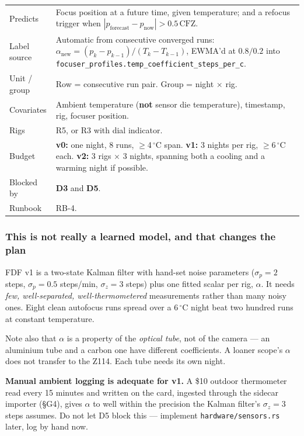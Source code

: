 \documentclass[11pt]{article}
\newcommand{\co}[1]{\texttt{\small #1}}
\begin{document}
\begin{center}
\small
\begin{tabular}{@{}p{}p{}@{}}
\toprule
Predicts & Focus position at a future time, given temperature; and a refocus trigger when $|p_{\mathrm{forecast}} - p_{\mathrm{now}}| > 0.5\,\mathrm{CFZ}$. \\
Label source & Automatic from consecutive converged runs: $\alpha_{\mathrm{new}} = (p_k - p_{k-1})/(T_k - T_{k-1})$, EWMA'd at $0.8/0.2$ into \co{focuser\_profiles.temp\_coefficient\_steps\_per\_c}. \\
Unit / group & Row = consecutive run pair. Group = night $\times$ rig. \\
Covariates & Ambient temperature (\textbf{not} sensor die temperature), timestamp, rig, focuser position. \\
Rigs & R5, or R3 with dial indicator. \\
Budget & \textbf{v0:} one night, 8 runs, $\geq$4\,$^\circ$C span. \textbf{v1:} 3 nights per rig, $\geq$6\,$^\circ$C each. \textbf{v2:} 3 rigs $\times$ 3 nights, spanning both a cooling and a warming night if possible. \\
Blocked by & \textbf{D3} and \textbf{D5}. \\
Runbook & RB-4. \\
\bottomrule
\end{tabular}
\end{center}

\subsubsection*{This is not really a learned model, and that changes the plan}

FDF v1 is a two-state Kalman filter with hand-set noise parameters
($\sigma_p = 2$ steps, $\sigma_{\dot p} = 0.5$ steps/min, $\sigma_z = 3$ steps)
plus one fitted scalar per rig, $\alpha$. It needs \emph{few, well-separated,
well-thermometered} measurements rather than many noisy ones. Eight clean
autofocus runs spread over a 6\,$^\circ$C night beat two hundred runs at
constant temperature.

Note also that $\alpha$ is a property of the \emph{optical tube}, not of the
camera --- an aluminium tube and a carbon one have different coefficients. A
loaner scope's $\alpha$ does not transfer to the Z114. Each tube needs its own
night.

\begin{keybox}
\textbf{Manual ambient logging is adequate for v1.} A \$10 outdoor
thermometer read every 15 minutes and written on the card, ingested through the
sidecar importer (\S G4), gives $\alpha$ to well within the precision the
Kalman filter's $\sigma_z = 3$ steps assumes. Do not let D5 block this ---
implement \co{hardware/sensors.rs} later, log by hand now.
\end{keybox}
\end{document}
